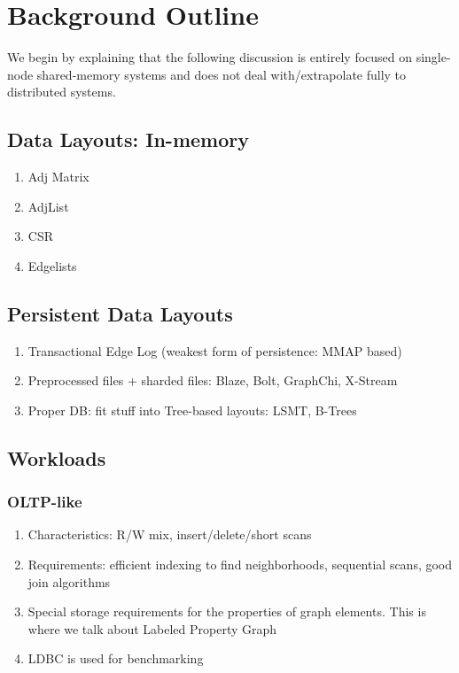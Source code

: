 \chapter{Background Outline}

We begin by explaining that the following discussion is entirely focused on single-node shared-memory systems and does not deal with/extrapolate fully to distributed systems.

\section{Data Layouts: In-memory}
\label{bg_out:inmem}
\begin{enumerate}
    \item Adj Matrix
    \item AdjList
    \item CSR
    \item Edgelists 
\end{enumerate}

\section{Persistent Data Layouts}
\label{bg_out:persistent}
\begin{enumerate}
    \item Transactional Edge Log (weakest form of persistence: MMAP based)
    \item Preprocessed files + sharded files: Blaze, Bolt, GraphChi, X-Stream
    \item Proper DB: fit stuff into Tree-based layouts: LSMT, B-Trees
\end{enumerate}

\section{Workloads}
\subsection{OLTP-like}
\begin{enumerate}
    \item Characteristics: R/W mix, insert/delete/short scans
    \item Requirements: efficient indexing to find neighborhoods, sequential scans, good join algorithms
    \item Special storage requirements for the properties of graph elements. This is where we talk about Labeled Property Graph
    \item  LDBC is used for benchmarking
\end{enumerate}	


